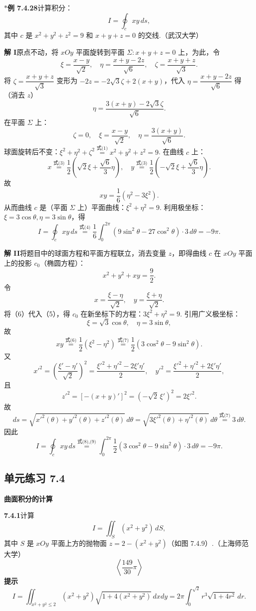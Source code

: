 \documentclass[UTF8,12pt,a4paper,fontset=fandol]{ctexart}
\providecommand{\xlongequal}[1]{\overset{#1}{=}}
\begin{document}
\noindent\textbf{$*$例 7.4.28}\quad 计算积分：
\[
I=\oint_c xy\,ds,
\]
其中 $c$ 是 $x^2+y^2+z^2=9$ 和 $x+y+z=0$ 的交线.（武汉大学）

\noindent\textbf{解 I}\quad 原点不动，将 $xOy$ 平面旋转到平面 $\Sigma:x+y+z=0$ 上，为此，令
\[
\xi=\frac{x-y}{\sqrt2},\quad \eta=\frac{x+y-2z}{\sqrt6},\quad \zeta=\frac{x+y+z}{\sqrt3}. \tag{1}
\]
将 $\zeta=\dfrac{x+y+z}{\sqrt3}$ 变形为 $-2z=-2\sqrt3\zeta+2(x+y)$，代入 $\eta=\dfrac{x+y-2z}{\sqrt6}$ 得（消去 $z$）
\[
\eta=\frac{3(x+y)-2\sqrt3\zeta}{\sqrt6}. \tag{2}
\]
在平面 $\Sigma$ 上：
\[
\zeta=0,\quad \xi=\frac{x-y}{\sqrt2},\quad \eta=\frac{3(x+y)}{\sqrt6}. \tag{3}
\]
球面旋转后不变：$\xi^2+\eta^2+\zeta^2\xlongequal{\text{式(1)}}x^2+y^2+z^2=9$. 在曲线 $c$ 上：
\[
x\xlongequal{\text{式(3)}}\frac12\left(\sqrt2\xi+\frac{\sqrt6}{3}\eta\right),\quad
y\xlongequal{\text{式(3)}}\frac12\left(-\sqrt2\xi+\frac{\sqrt6}{3}\eta\right).
\]
故
\[
xy=\frac16(\eta^2-3\xi^2). \tag{4}
\]
从而曲线 $c$ 是（平面 $\Sigma$ 上）平面曲线：$\xi^2+\eta^2=9$. 利用极坐标：$\xi=3\cos\theta,\eta=3\sin\theta$，得
\[
I=\oint_cxy\,ds\xlongequal{\text{式(4)}}\frac16\int_0^{2\pi}(9\sin^2\theta-27\cos^2\theta)\cdot3\,d\theta=-9\pi.
\]

\noindent\textbf{解 II}\quad 将题目中的球面方程和平面方程联立，消去变量 $z$，即得曲线 $c$ 在 $xOy$ 平面上的投影 $c_0$（椭圆方程）：
\[
x^2+y^2+xy=\frac92. \tag{5}
\]
令
\[
x=\frac{\xi-\eta}{\sqrt2},\quad y=\frac{\xi+\eta}{\sqrt2}. \tag{6}
\]
将（6）代入（5），得 $c_0$ 在新坐标下的方程：$3\xi^2+\eta^2=9$. 引用广义极坐标：
\[
\xi=\sqrt3\cos\theta,\quad \eta=3\sin\theta, \tag{7}
\]
故
\[
xy\xlongequal{\text{式(6)}}\frac12(\xi^2-\eta^2)
\xlongequal{\text{式(7)}}\frac12(3\cos^2\theta-9\sin^2\theta). \tag{8}
\]
又
\[
x'^2=\left(\frac{\xi'-\eta'}{\sqrt2}\right)^2
=\frac{\xi'^2+\eta'^2-2\xi'\eta'}2,\quad
y'^2=\frac{\xi'^2+\eta'^2+2\xi'\eta'}2,
\]
且
\[
z'^2=[-(x+y)']^2=(-\sqrt2\,\xi')^2=2\xi'^2.
\]
故
\[
ds=\sqrt{x'^2(\theta)+y'^2(\theta)+z'^2(\theta)}\,d\theta
=\sqrt{3\xi'^2(\theta)+\eta'^2(\theta)}\,d\theta
\xlongequal{\text{式(7)}}3\,d\theta. \tag{9}
\]
因此
\[
I=\oint_cxy\,ds\xlongequal{\text{式(8),(9)}}\int_0^{2\pi}\frac12(3\cos^2\theta-9\sin^2\theta)\cdot3\,d\theta=-9\pi.
\]

\subsection*{单元练习 7.4}

\noindent\textbf{曲面积分的计算}

\noindent\textbf{7.4.1}\quad 计算
\[
I=\iint_S(x^2+y^2)\,dS,
\]
其中 $S$ 是 $xOy$ 平面上方的抛物面 $z=2-(x^2+y^2)$（如图 7.4.9）.（上海师范大学）
\[
\left\langle \frac{149}{30}\pi\right\rangle
\]
\noindent\textbf{提示}\quad
\[
I=\iint_{x^2+y^2\le2}(x^2+y^2)\sqrt{1+4(x^2+y^2)}\,dxdy
=2\pi\int_0^{\sqrt2}r^3\sqrt{1+4r^2}\,dr.
\]
\end{document}
